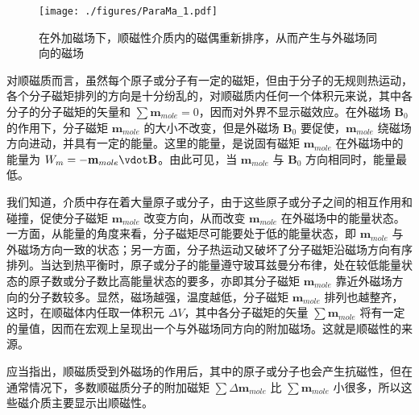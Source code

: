 
\begin{figure}[ht]
\centering
\texttt{[image: ./figures/ParaMa\_1.pdf]}
\caption{在外加磁场下，顺磁性介质内的磁偶重新排序，从而产生与外磁场同向的磁场} \label{ParaMa_fig1}
\end{figure}

对顺磁质而言，虽然每个原子或分子有一定的磁矩，但由于分子的无规则热运动，各个分子磁矩排列的方向是十分纷乱的，对顺磁质内任何一个体积元来说，其中各分子的分子磁矩的矢量和 $\sum \mathbf{m}_{mole}=0$，因而对外界不显示磁效应。在外磁场 $\mathbf B_0$ 的作用下，分子磁矩 $\mathbf{m}_{mole}$ 的大小不改变，但是外磁场 $\mathbf B_0$ 要促使，$\mathbf{m}_{mole}$ 绕磁场方向进动，并具有一定的能量。这里的能量，是说固有磁矩 $\mathbf m_{mole}$ 在外磁场中的能量为 $W_m=-\mathbf m_{mole} \vdot \mathbf B$。由此可见，当 $\mathbf m_{mole}$ 与 $\mathbf B_0$ 方向相同时，能量最低。

我们知道，介质中存在着大量原子或分子，由于这些原子或分子之间的相互作用和碰撞，促使分子磁矩 $\mathbf m_{mole}$ 改变方向，从而改变 $\mathbf m_{mole}$ 在外磁场中的能量状态。一方面，从能量的角度来看，分子磁矩尽可能要处于低的能量状态，即 $\mathbf m_{mole}$ 与外磁场方向一致的状态；另一方面，分子热运动又破坏了分子磁矩沿磁场方向有序排列。当达到热平衡时，原子或分子的能量遵守玻耳兹曼分布律，处在较低能量状态的原子数或分子数比高能量状态的要多，亦即其分子磁矩 $\mathbf m_{mole}$ 靠近外磁场方向的分子数较多。显然，磁场越强，温度越低，分子磁矩 $\mathbf m_{mole}$ 排列也越整齐，这时，在顺磁体内任取一体积元 $\Delta V$，其中各分子磁矩的矢量 $\sum \mathbf m_{mole}$ 将有一定的量值，因而在宏观上呈现出一个与外磁场同方向的附加磁场。这就是顺磁性的来源。

应当指出，顺磁质受到外磁场的作用后，其中的原子或分子也会产生抗磁性，但在通常情况下，多数顺磁质分子的附加磁矩 $\sum \Delta\mathbf m_{mole}$ 比 $\sum \mathbf m_{mole}$ 小很多，所以这些磁介质主要显示出顺磁性。